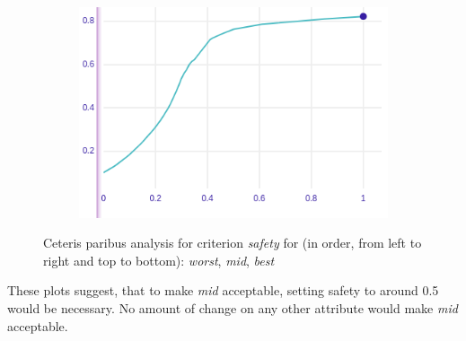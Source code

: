 \documentclass[../main.tex]{subfiles}
\begin{document}
\begin{figure}
    \begin{subfigure}[b]{0.48\linewidth}
        \includegraphics[width=\linewidth]{../img/ANN_safety_best.png}
    \end{subfigure}

    \caption{Ceteris paribus analysis for criterion \emph{safety} for (in order, from left to right and
    top to bottom): \emph{worst}, \emph{mid}, \emph{best}}
\end{figure}

These plots suggest, that to make \emph{mid} acceptable, setting safety to around
0.5 would be necessary. No amount of change on any other attribute would make \emph{mid} acceptable.
\end{document}

